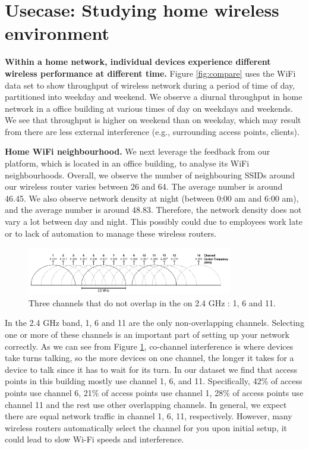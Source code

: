 \section{Usecase: Studying home wireless environment}
\label{sec.usecase3}

\textbf{Within a home network, individual devices experience different wireless performance at different time.} Figure \ref{fig:compare} uses the WiFi data set to show throughput of wireless network during a period of time of day, partitioned into weekday and weekend. We observe a diurnal throughput in home network in a office building at various times of day on weekdays and weekends. We see that throughput is higher on weekend than on weekday, which may result from there are less external interference (e.g., surrounding access points, clients).

\textbf{Home WiFi neighbourhood.} We next leverage the feedback from our platform, which is located in an office building, to analyse its WiFi neighbourhoods. Overall, we observe the number of neighbouring SSIDs around our wireless router varies between 26 and 64. The average number is around 46.45. We also observe network density at night (between 0:00 am and 6:00 am), and the average number is around 48.83. Therefore, the network density does not vary a lot between day and night. This possibly could due to employees work late or to lack of automation to manage these wireless routers.

\begin{figure}
\centering
\includegraphics[width=0.8\textwidth]{figure/2GHz_WiFi_channels.png}
\caption{Three channels that do not overlap in the on 2.4 GHz : 1, 6 and 11\cite{wlanchannels}.} 
\label{fig:channels}
\end{figure}

In the 2.4 GHz band, 1, 6 and 11 are the only non-overlapping channels. Selecting one or more of these channels is an important part of setting up your network correctly. As we can see from Figure \ref{fig:channels}, co-channel interference is where devices take turns talking, so the more devices on one channel, the longer it takes for a device to talk since it has to wait for its turn. In our dataset we find that access points in this building mostly use channel 1, 6, and 11. Specifically, 42\% of access points use channel 6, 21\% of access points use channel 1, 28\% of access points use channel 11 and the rest use other overlapping channels. In general, we expect there are equal network traffic in channel 1, 6, 11, respectively. However,  many wireless routers automatically select the channel for you upon initial setup, it could lead to slow Wi-Fi speeds and interference. 

